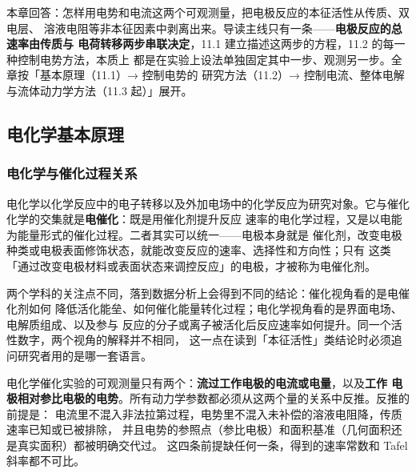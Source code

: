 
%
{本章回答：怎样用电势和电流这两个可观测量，把电极反应的本征活性从传质、双电层、
溶液电阻等非本征因素中剥离出来。导读主线只有一条——\textbf{电极反应的总速率由传质与
电荷转移两步串联决定}，11.1 建立描述这两步的方程，11.2 的每一种控制电势方法，本质上
都是在实验上设法单独固定其中一步、观测另一步。全章按「基本原理（11.1）→ 控制电势的
研究方法（11.2）→ 控制电流、整体电解与流体动力学方法（11.3 起）」展开。}
\label{ch:11}

\subsection{电化学基本原理}

\subsubsection{电化学与催化过程关系}

电化学以化学反应中的电子转移以及外加电场中的化学反应为研究对象。它与催化化学的交集就是\textbf{电催化}：既是用催化剂提升反应
速率的电化学过程，又是以电能为能量形式的催化过程。二者其实可以统一——电极本身就是
催化剂，改变电极种类或电极表面修饰状态，就能改变反应的速率、选择性和方向性；只有
这类「通过改变电极材料或表面状态来调控反应」的电极，才被称为电催化剂。

两个学科的关注点不同，落到数据分析上会得到不同的结论：催化视角看的是电催化剂如何
降低活化能垒、如何催化能量转化过程；电化学视角看的是界面电场、电解质组成、以及参与
反应的分子或离子被活化后反应速率如何提升。同一个活性数字，两个视角的解释并不相同，
这一点在读到「本征活性」类结论时必须追问研究者用的是哪一套语言。

\begin{probout}
电化学催化实验的可观测量只有两个：\textbf{流过工作电极的电流或电量}，以及\textbf{工作
电极相对参比电极的电势}。所有动力学参数都必须从这两个量的关系中反推。反推的前提是：
电流里不混入非法拉第过程，电势里不混入未补偿的溶液电阻降，传质速率已知或已被排除，
并且电势的参照点（参比电极）和面积基准（几何面积还是真实面积）都被明确交代过。
这四条前提缺任何一条，得到的速率常数和 Tafel 斜率都不可比。
\end{probout}

